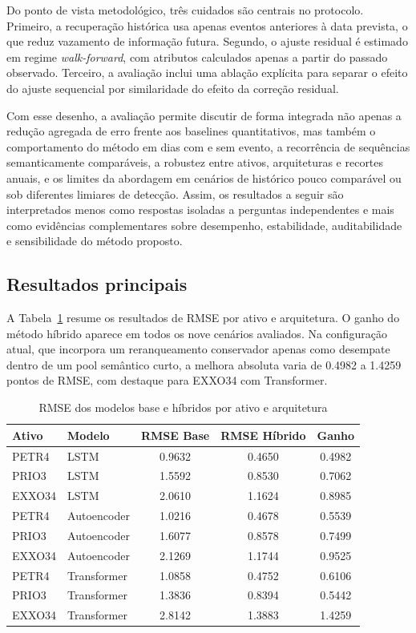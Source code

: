 \documentclass[12pt]{article}
\begin{document}
Do ponto de vista metodológico, três cuidados são centrais no protocolo. Primeiro, a recuperação histórica usa apenas eventos anteriores à data prevista, o que reduz vazamento de informação futura. Segundo, o ajuste residual é estimado em regime \textit{walk-forward}, com atributos calculados apenas a partir do passado observado. Terceiro, a avaliação inclui uma ablação explícita para separar o efeito do ajuste sequencial por similaridade do efeito da correção residual.

Com esse desenho, a avaliação permite discutir de forma integrada não apenas a redução agregada de erro frente aos baselines quantitativos, mas também o comportamento do método em dias com e sem evento, a recorrência de sequências semanticamente comparáveis, a robustez entre ativos, arquiteturas e recortes anuais, e os limites da abordagem em cenários de histórico pouco comparável ou sob diferentes limiares de detecção. Assim, os resultados a seguir são interpretados menos como respostas isoladas a perguntas independentes e mais como evidências complementares sobre desempenho, estabilidade, auditabilidade e sensibilidade do método proposto.

\subsection{Resultados principais}

A Tabela~\ref{tab:rmse_principal} resume os resultados de RMSE por ativo e arquitetura. O ganho do método híbrido aparece em todos os nove cenários avaliados. Na configuração atual, que incorpora um reranqueamento conservador apenas como desempate dentro de um pool semântico curto, a melhora absoluta varia de 0.4982 a 1.4259 pontos de RMSE, com destaque para EXXO34 com Transformer.

\begin{table}[H]
\centering
\small
\caption{RMSE dos modelos base e híbridos por ativo e arquitetura}
\label{tab:rmse_principal}
\begin{tabular}{l l c c c}
\toprule
\textbf{Ativo} & \textbf{Modelo} & \textbf{RMSE Base} & \textbf{RMSE Híbrido} & \textbf{Ganho} \\
\midrule
PETR4  & LSTM         & 0.9632 & 0.4650 & 0.4982 \\
PRIO3  & LSTM         & 1.5592 & 0.8530 & 0.7062 \\
EXXO34 & LSTM         & 2.0610 & 1.1624 & 0.8985 \\
PETR4  & Autoencoder  & 1.0216 & 0.4678 & 0.5539 \\
PRIO3  & Autoencoder  & 1.6077 & 0.8578 & 0.7499 \\
EXXO34 & Autoencoder  & 2.1269 & 1.1744 & 0.9525 \\
PETR4  & Transformer  & 1.0858 & 0.4752 & 0.6106 \\
PRIO3  & Transformer  & 1.3836 & 0.8394 & 0.5442 \\
EXXO34 & Transformer  & 2.8142 & 1.3883 & 1.4259 \\
\bottomrule
\end{tabular}
\end{table}
\end{document}
